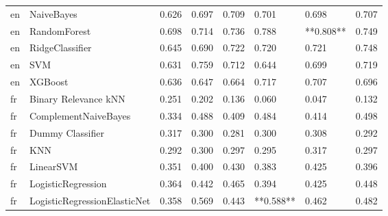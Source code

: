 \begin{tabular}{llllllll}
      en &                      NaiveBayes & 0.626 &                     0.697 &                 0.709 &                  0.701 &                                   0.698 &     0.707 \\
      en &                    RandomForest & 0.698 &                     0.714 &                 0.736 &                  0.788 &                               **0.808** &     0.749 \\
      en &                 RidgeClassifier & 0.645 &                     0.690 &                 0.722 &                  0.720 &                                   0.721 &     0.748 \\
      en &                             SVM & 0.631 &                     0.759 &                 0.712 &                  0.644 &                                   0.699 &     0.719 \\
      en &                         XGBoost & 0.636 &                     0.647 &                 0.664 &                  0.717 &                                   0.707 &     0.696 \\
      fr &            Binary Relevance kNN & 0.251 &                     0.202 &                 0.136 &                  0.060 &                                   0.047 &     0.132 \\
      fr &            ComplementNaiveBayes & 0.334 &                     0.488 &                 0.409 &                  0.484 &                                   0.414 &     0.498 \\
      fr &                Dummy Classifier & 0.317 &                     0.300 &                 0.281 &                  0.300 &                                   0.308 &     0.292 \\
      fr &                             KNN & 0.292 &                     0.300 &                 0.297 &                  0.295 &                                   0.317 &     0.297 \\
      fr &                       LinearSVM & 0.351 &                     0.400 &                 0.430 &                  0.383 &                                   0.425 &     0.396 \\
      fr &              LogisticRegression & 0.364 &                     0.442 &                 0.465 &                  0.394 &                                   0.425 &     0.448 \\
      fr &    LogisticRegressionElasticNet & 0.358 &                     0.569 &                 0.443 &              **0.588** &                                   0.462 &     0.482 \\

\end{tabular}
